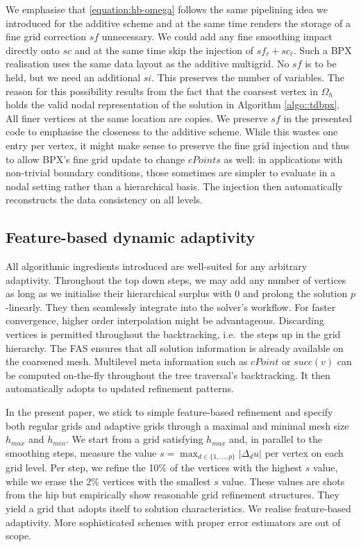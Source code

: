 We emphasise that \eqref{equation:hb-omega} follows the same pipelining idea we
introduced for the additive scheme and at the same time renders the storage of a
fine grid correction $sf$ unnecessary.
We could add any fine smoothing impact directly onto $sc$ and at the same time
skip the injection of $sf_\ell + sc_\ell$.
Such a BPX realisation uses the same data layout as the additive multigrid.
No $sf$ is to be held, but we need an additional $si$.
This preserves the number of variables.
The reason for this possibility results from the fact that the coarsest
vertex in $\Omega_h$ holds the valid nodal representation of the
solution in Algorithm
\ref{algo::tdbpx}.
All finer vertices at the same location are copies.
We preserve $sf$ in the presented code to emphasise the closeness to the
additive scheme.
While this wastes one entry per vertex, it might
make sense to preserve the fine grid injection and thus to allow
BPX's fine grid update to change $cPoints$ as well:
in applications with non-trivial boundary conditions, those sometimes are
simpler to evaluate in a nodal setting rather than a hierarchical basis.
The injection then automatically reconstructs the data consistency on all
levels.


\subsection{Feature-based dynamic adaptivity}

All algorithmic ingredients introduced are well-suited for any arbitrary 
adaptivity.
Throughout the top down steps, we may add any number of vertices as
long as we initialise their hierarchical surplus with 0 and prolong the solution
$p$-linearly.
They then seamlessly integrate into the solver's workflow. 
For faster convergence, higher order interpolation might be advantageous.
Discarding vertices is permitted throughout the backtracking, i.e.~the steps up
in the grid hierarchy.
The FAS ensures that all solution information is already available on the
coarsened mesh.
Multilevel meta information such as $cPoint$ or $succ(v)$ can be computed
on-the-fly throughout the tree traversal's backtracking.
It then automatically adopts to updated refinement patterns.


In the present paper, we stick to simple feature-based refinement and specify
both regular grids and adaptive grids through a maximal and
minimal mesh size $h_{max}$ and $h_{min}$.
We start from a grid satisfying $h_{max}$ and, in parallel to
the smoothing steps, measure the value $s = \max _{d \in \{1,\ldots,p\}} 
|\Delta _d u|$ per vertex on each grid level.
Per step, we refine the 10\% of the vertices with the highest $s$ value, while
we erase the 2\% vertices with the smallest $s$ value.
These values are shots from the hip but empirically show reasonable
grid refinement structures.
They yield a grid that adopts itself to solution characteristics.
We realise feature-based adaptivity.
More sophisticated schemes with proper error estimators are out of scope.


